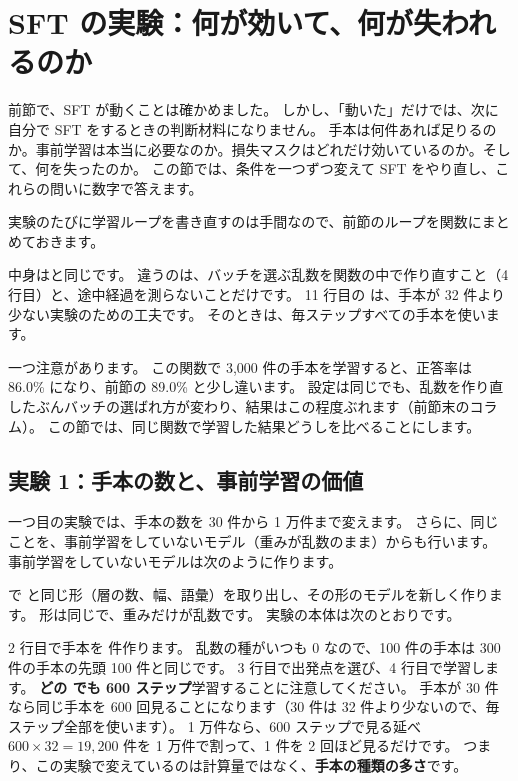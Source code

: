 \section{SFT の実験：何が効いて、何が失われるのか}\label{sec:post-sft-exp}

前節で、SFT が動くことは確かめました。
しかし、「動いた」だけでは、次に自分で SFT をするときの判断材料になりません。
手本は何件あれば足りるのか。事前学習は本当に必要なのか。損失マスクはどれだけ効いているのか。そして、何を失ったのか。
この節では、条件を一つずつ変えて SFT をやり直し、これらの問いに数字で答えます。

実験のたびに学習ループを書き直すのは手間なので、前節のループを関数にまとめておきます。


中身はと同じです。
違うのは、バッチを選ぶ乱数を関数の中で作り直すこと（4 行目）と、途中経過を測らないことだけです。
11 行目の  は、手本が 32 件より少ない実験のための工夫です。
そのときは、毎ステップすべての手本を使います。

一つ注意があります。
この関数で 3,000 件の手本を学習すると、正答率は 86.0\% になり、前節の 89.0\% と少し違います。
設定は同じでも、乱数を作り直したぶんバッチの選ばれ方が変わり、結果はこの程度ぶれます（前節末のコラム）。
この節では、同じ関数で学習した結果どうしを比べることにします。

\subsection{実験 1：手本の数と、事前学習の価値}\label{sec:post-exp-data}

一つ目の実験では、手本の数を 30 件から 1 万件まで変えます。
さらに、同じことを、事前学習をしていないモデル（重みが乱数のまま）からも行います。
事前学習をしていないモデルは次のように作ります。


 で  と同じ形（層の数、幅、語彙）を取り出し、その形のモデルを新しく作ります。
形は同じで、重みだけが乱数です。
実験の本体は次のとおりです。


2 行目で手本を  件作ります。
乱数の種がいつも 0 なので、100 件の手本は 300 件の手本の先頭 100 件と同じです。
3 行目で出発点を選び、4 行目で学習します。
\textbf{どの  でも 600 ステップ}学習することに注意してください。
手本が 30 件なら同じ手本を 600 回見ることになります（30 件は 32 件より少ないので、毎ステップ全部を使います）。
1 万件なら、600 ステップで見る延べ $600 \times 32 = 19{,}200$ 件を 1 万件で割って、1 件を 2 回ほど見るだけです。
つまり、この実験で変えているのは計算量ではなく、\textbf{手本の種類の多さ}です。

